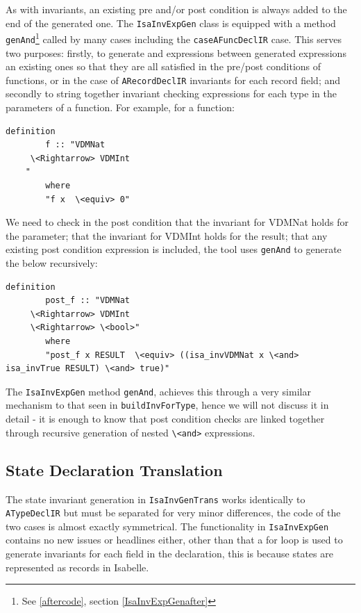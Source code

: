 	As with invariants, an existing pre and/or post condition is always added to the end of the generated one. The \lstinline[language=Java]{IsaInvExpGen} class is equipped with a method \lstinline[language=Java]{genAnd}\footnote{See \ref{aftercode}, section \ref{IsaInvExpGenafter}} called by many cases including the \lstinline[language=Java]{caseAFuncDeclIR} case. This serves two purposes: firstly, to generate and expressions between generated expressions an existing ones so that they are all satisfied in the pre/post conditions of functions, or in the case of \lstinline[language=Java]{ARecordDeclIR} invariants for each record field; and secondly to string together invariant checking expressions for each type in the parameters of a function. For example, for a function:
	\begin{lstlisting}[language=Isabelle]
	definition
		f :: "VDMNat
	 \<Rightarrow> VDMInt
	"
	    where
	    "f x  \<equiv> 0"
	\end{lstlisting}
	We need to check in the post condition that the invariant for VDMNat holds for the parameter; that the invariant for VDMInt holds for the result; that any existing post condition expression is included, the tool uses \lstinline[language=Java]{genAnd} to generate the below recursively:
	\begin{lstlisting}[language=Isabelle]
	definition
		post_f :: "VDMNat
	 \<Rightarrow> VDMInt
	 \<Rightarrow> \<bool>"
	    where
	    "post_f x RESULT  \<equiv> ((isa_invVDMNat x \<and> isa_invTrue RESULT) \<and> true)"

	\end{lstlisting}
	The \lstinline[language=Java]{IsaInvExpGen} method \lstinline[language=Java]{genAnd}, achieves this through a very similar mechanism to that seen in \lstinline[language=Java]{buildInvForType}, hence we will not discuss it in detail - it is enough to know that post condition checks are linked together through recursive generation of nested \lstinline[language=Isabelle]{\<and>} expressions.

	\subsection{State Declaration Translation}
	The state invariant generation in \lstinline[language=Java]{IsaInvGenTrans} works identically to \lstinline[language=Java]{ATypeDeclIR} but must be separated for very minor differences, the code of the two cases is almost exactly symmetrical. The functionality in \lstinline[language=Java]{IsaInvExpGen} contains no new issues or headlines either, other than that a for loop is used to generate invariants for each field in the declaration, this is because states are represented as records in Isabelle. 


